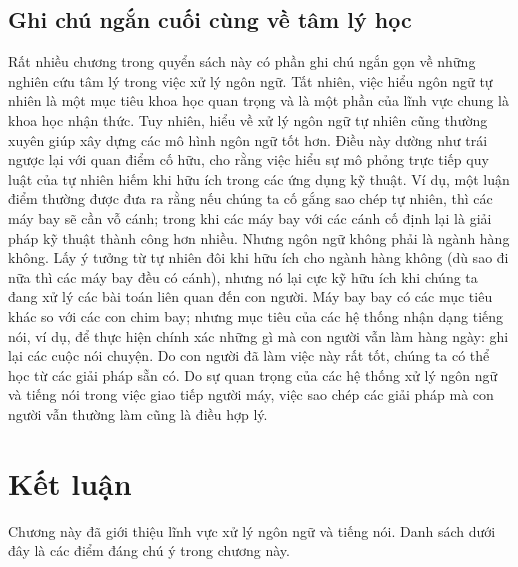 \subsection{Ghi chú ngắn cuối cùng về tâm lý học}

Rất nhiều chương trong quyển sách này có phần ghi chú ngắn gọn về những nghiên cứu tâm lý trong việc xử lý ngôn ngữ. Tất nhiên, việc hiểu ngôn ngữ tự nhiên là một mục tiêu khoa học quan trọng và là một phần của lĩnh vực chung là khoa học nhận thức. Tuy nhiên, hiểu về xử lý ngôn ngữ tự nhiên cũng thường xuyên giúp xây dựng các mô hình ngôn ngữ tốt hơn. Điều này dường như trái ngược lại với quan điểm cố hữu, cho rằng việc hiểu sự mô phỏng trực tiếp quy luật của tự nhiên hiếm khi hữu ích trong các ứng dụng kỹ thuật. Ví dụ, một luận điểm thường được đưa ra rằng nếu chúng ta cố gắng sao chép tự nhiên, thì các máy bay sẽ cần vỗ cánh; trong khi các máy bay với các cánh cố định lại là giải pháp kỹ thuật thành công hơn nhiều. Nhưng ngôn ngữ không phải là ngành hàng không. Lấy ý tưởng từ tự nhiên đôi khi hữu ích cho ngành hàng không (dù sao đi nữa thì các máy bay đều có cánh), nhưng nó lại cực kỹ hữu ích khi chúng ta đang xử lý các bài toán liên quan đến con người. Máy bay bay có các mục tiêu khác so với các con chim bay; nhưng mục tiêu của các hệ thống nhận dạng tiếng nói, ví dụ, để thực hiện chính xác những gì mà con người vẫn làm hàng ngày: ghi lại các cuộc nói chuyện. Do con người đã làm việc này rất tốt, chúng ta có thể học từ các giải pháp sẵn có. Do sự quan trọng của các hệ thống xử lý ngôn ngữ và tiếng nói trong việc giao tiếp người máy, việc sao chép các giải pháp mà con người vẫn thường làm cũng là điều hợp lý.

\section{Kết luận}

Chương này đã giới thiệu lĩnh vực xử lý ngôn ngữ và tiếng nói. Danh sách dưới đây là các điểm đáng chú ý trong chương này.

